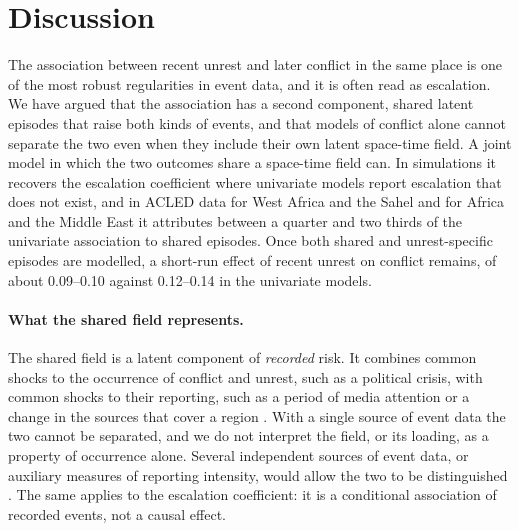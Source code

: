 \section{Discussion}\label{sec:discussion}

The association between recent unrest and later conflict in the same place is one of
the most robust regularities in event data, and it is often read as escalation. We
have argued that the association has a second component, shared latent episodes that
raise both kinds of events, and that models of conflict alone cannot separate the two
even when they include their own latent space-time field. A joint model in which the
two outcomes share a space-time field can. In simulations it recovers the escalation
coefficient where univariate models report escalation that does not exist, and in
ACLED data for West Africa and the Sahel and for Africa and the Middle East it
attributes between a quarter and two thirds of the univariate association to shared
episodes. Once both shared and unrest-specific episodes are modelled, a short-run
effect of recent unrest on conflict remains, of about 0.09--0.10 against 0.12--0.14 in
the univariate models.

\paragraph{What the shared field represents.} The shared field is a latent component
of \emph{recorded} risk. It combines common shocks to the occurrence of conflict and
unrest, such as a political crisis, with common shocks to their reporting, such as a
period of media attention or a change in the sources that cover a region
\citep{weidmann2016closer, hellmeier2018spotlight, croicu2022reporting}. With a single
source of event data the two cannot be separated, and we do not interpret the field,
or its loading, as a property of occurrence alone. Several independent sources of
event data, or auxiliary measures of reporting intensity, would allow the two to be
distinguished \citep{cook2017twowrongs}. The same applies to the escalation
coefficient: it is a conditional association of recorded events, not a causal
effect.

